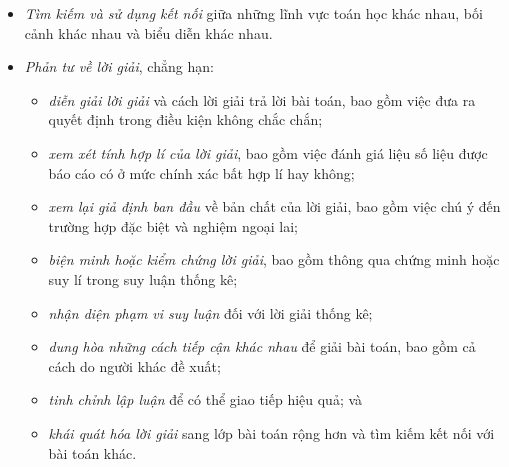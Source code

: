 {{\begin{itemize}
\begin{itemize}
      \item \emph{thực hiện suy diễn logic} dựa trên tiến triển hiện tại, kiểm tra phỏng đoán và mở rộng kết quả ban đầu; và

      \item \emph{theo dõi tiến trình đi đến lời giải}, bao gồm xem xét lại chiến lược đã chọn và chiến lược khả dĩ khác do chính mình hoặc người khác đề xuất.
    \end{itemize}

    \item \emph{Tìm kiếm và sử dụng kết nối} giữa những lĩnh vực toán học khác nhau, bối cảnh khác nhau và biểu diễn khác nhau.

    \item \emph{Phản tư về lời giải}, chẳng hạn:\vspace{\baselineskip}

    \begin{itemize}
      \item \vspace*{\baselineskip}\emph{diễn giải lời giải} và cách lời giải trả lời bài toán, bao gồm việc đưa ra quyết định trong điều kiện không chắc chắn;

      \item \emph{xem xét tính hợp lí của lời giải}, bao gồm việc đánh giá liệu số liệu được báo cáo có ở mức chính xác bất hợp lí hay không;\vspace{\baselineskip}

      \item \emph{xem lại giả định ban đầu} về bản chất của lời giải, bao gồm việc chú ý đến trường hợp đặc biệt và nghiệm ngoại lai;

      \item \emph{biện minh hoặc kiểm chứng lời giải}, bao gồm thông qua chứng minh hoặc suy lí trong suy luận thống kê;

      \item \emph{nhận diện phạm vi suy luận} đối với lời giải thống kê;

      \item \emph{dung hòa những cách tiếp cận khác nhau} để giải bài toán, bao gồm cả cách do người khác đề xuất;

      \item \emph{tinh chỉnh lập luận} để có thể giao tiếp hiệu quả; và

      \item \emph{khái quát hóa lời giải} sang lớp bài toán rộng hơn và tìm kiếm kết nối với bài toán khác.
    \end{itemize}
  \end{itemize}
  }
  }
